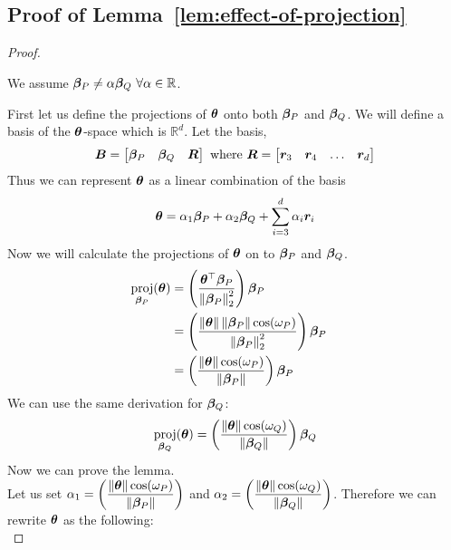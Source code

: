 \documentclass{article} %
\DeclareMathOperator{\proj}{proj}
\newcommand{\norm}[1]{\left\lVert#1\right\rVert}
\begin{document}
\begin{appendices}
	\subsection{Proof of Lemma~\ref{lem:effect-of-projection}}
	\label{app:effect-of-projection}
	\begin{proof}
		\begin{assumption}
			\label{asm:p-q-linear-independence}
			We assume ${\bm{\beta}}_P \neq \alpha {\bm{\beta}}_Q\,\, \forall \alpha \in \mathbb{R}$.
		\end{assumption}
		First let us define the projections of ${\bm{\theta}}$ onto both ${\bm{\beta}}_P$ and ${\bm{\beta}}_Q$. We will define a basis of the ${\bm{\theta}}$-space which is $\mathbb{R}^d$. Let the basis,
		\begin{equation}
			{\bm{B}} = \begin{bmatrix} {\bm{\beta}}_P & {\bm{\beta}}_Q & {\bm{R}} \end{bmatrix} \text{ where } {\bm{R}}= \begin{bmatrix}	{\bm{r}}_3 & {\bm{r}}_4 & \dots & {\bm{r}}_{d} \end{bmatrix}
		\end{equation}
		Thus we can represent ${\bm{\theta}}$ as a linear combination of the basis 
		\begin{equation}
			{\bm{\theta}} = \alpha_1 {\bm{\beta}}_P + \alpha_2 {\bm{\beta}}_Q + \sum_{i=3}^d \alpha_i {\bm{r}}_i 
		\end{equation}
		Now we will calculate the projections of ${\bm{\theta}}$ on to ${\bm{\beta}}_P$ and ${\bm{\beta}}_Q$.
		\begin{align*}
			\proj_{\vbeta_P}(\vtheta) &= \left(\frac{\vtheta^\top \vbeta_P}{\norm{\vbeta_P}^2_2}\right)\vbeta_P &&\\
			&= \left(\frac{\norm{\vtheta}\norm{\vbeta_P}\cos(\omega_P)}{\norm{\vbeta_P}^2_2}\right)\vbeta_P &&\\
			&= \left(\frac{\norm{\vtheta}\cos(\omega_P)}{\norm{\vbeta_P}}\right)\vbeta_P &&
		\end{align*}
		We can use the same derivation for ${\bm{\beta}}_Q$:
		\begin{equation}
			\proj_{\vbeta_Q}(\vtheta) = \left(\frac{\norm{\vtheta}\cos(\omega_Q)}{\norm{\vbeta_Q}}\right)\vbeta_Q
		\end{equation}
		Now we can prove the lemma.\\
		Let us set $\displaystyle \alpha_1 = \left(\frac{\norm{\vtheta}\cos(\omega_P)}{\norm{\vbeta_P}}\right)$ and $\displaystyle \alpha_2 = \left(\frac{\norm{\vtheta}\cos(\omega_Q)}{\norm{\vbeta_Q}}\right)$. Therefore we can rewrite ${\bm{\theta}}$ as the following:
		\begin{equation}

\end{equation}
\end{proof}
\end{appendices}
\end{document}
